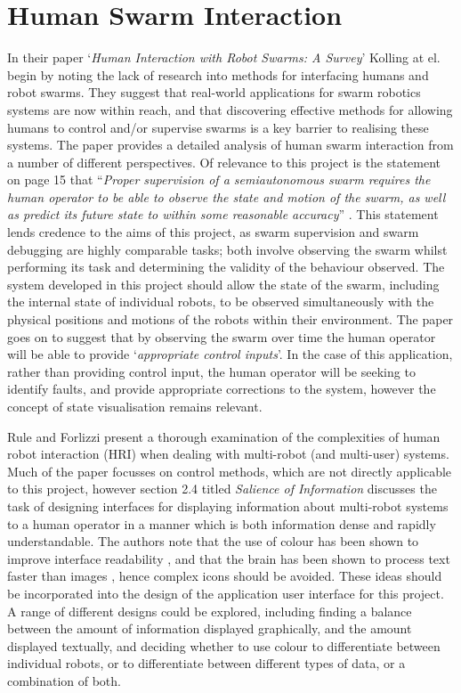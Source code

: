 
\section{Human Swarm Interaction} \label{HumanSwarmInteraction}
In their paper `\textit{Human Interaction with Robot Swarms: A Survey}' \cite{Kolling:2016} Kolling at el. begin by noting the lack of research into methods for interfacing humans and robot swarms. They suggest that real-world applications for swarm robotics systems are now within reach, and that discovering effective methods for allowing humans to control and/or supervise swarms is a key barrier to realising these systems. The paper \cite{Kolling:2016} provides a detailed analysis of human swarm interaction from a number of different perspectives. Of relevance to this project is the statement on page 15 that ``\textit{Proper supervision of a semiautonomous swarm requires the human operator to be able to observe the state and motion of the swarm, as well as predict its future state to within some reasonable accuracy}'' \cite{Kolling:2016}. This statement lends credence to the aims of this project, as swarm supervision and swarm debugging are highly comparable tasks; both involve observing the swarm whilst performing its task and determining the validity of the behaviour observed. The system developed in this project should allow the state of the swarm, including the internal state of individual robots, to be observed simultaneously with the physical positions and motions of the robots within their environment. The paper \cite{Kolling:2016} goes on to suggest that by observing the swarm over time the human operator will be able to provide `\textit{appropriate control inputs}'. In the case of this application, rather than providing control input, the human operator will be seeking to identify faults, and provide appropriate corrections to the system, however the concept of state visualisation remains relevant.

Rule and Forlizzi \cite{Rule:2012} present a thorough examination of the complexities of human robot interaction (HRI) when dealing with multi-robot (and multi-user) systems. Much of the paper focusses on control methods, which are not directly applicable to this project, however section 2.4 titled \textit{Salience of Information} discusses the task of designing interfaces for displaying information about multi-robot systems to a human operator in a manner which is both information dense and rapidly understandable. The authors note that the use of colour has been shown to improve interface readability \cite{Christ:1984}, and that the brain has been shown to process text faster than images \cite{Carney:1998}, hence complex icons should be avoided. These ideas should be incorporated into the design of the application user interface for this project. A range of different designs could be explored, including finding a balance between the amount of information displayed graphically, and the amount displayed textually, and deciding whether to use colour to differentiate between individual robots, or to differentiate between different types of data, or a combination of both.

